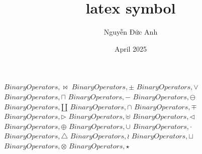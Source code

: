 \documentclass{article}
\title{latex symbol}
\author{Nguyễn Đức Anh}
\date{April 2025}
\begin{document}
\setlength{\parindent}{0cm}

$Binary Operators,\bowtie$
\linebreak
\linebreak
$Binary Operators,\pm$
\linebreak
\linebreak
$Binary Operators,\lor$
\linebreak
\linebreak
$Binary Operators,\sqcap$
\linebreak
\linebreak
$Binary Operators,-$
\linebreak
\linebreak
$Binary Operators,\ominus$
\linebreak
\linebreak
$Binary Operators,\amalg$
\linebreak
\linebreak
$Binary Operators,\cap$
\linebreak
\linebreak
$Binary Operators,\mp$
\linebreak
\linebreak
$Binary Operators,\triangleright$
\linebreak
\linebreak
$Binary Operators,\uplus$
\linebreak
\linebreak
$Binary Operators,\triangleleft$
\linebreak
\linebreak
$Binary Operators,\oplus$
\linebreak
\linebreak
$Binary Operators,\cup$
\linebreak
\linebreak
$Binary Operators,\cdot$
\linebreak
\linebreak
$Binary Operators,\bigtriangleup$
\linebreak
\linebreak
$Binary Operators,\wr$
\linebreak
\linebreak
$Binary Operators,\sqcup$
\linebreak
\linebreak
$Binary Operators,\otimes$
\linebreak
\linebreak
$Binary Operators,\star$
\linebreak
\linebreak
\end{document}
